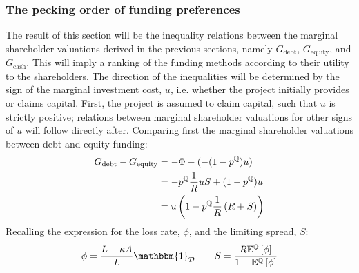 \documentclass[../main.tex]{subfiles}
\begin{document}
    \subsubsection{The pecking order of funding preferences}
        The result of this section will be the inequality relations between the marginal shareholder valuations
        derived in the previous sections, namely $G_{\text{debt}}$, $G_{\text{equity}}$, and $G_{\text{cash}}$.
        This will imply a ranking of the funding methods according to their utility to the shareholders.
        The direction of the inequalities will be determined by the sign of the marginal investment cost, $u$,
        i.e. whether the project initially provides or claims capital. 
        First, the project is assumed to claim capital, such that $u$ is strictly positive;
        relations between marginal shareholder valuations for other signs of $u$ will follow directly after.
        Comparing first the marginal shareholder valuations between debt and equity funding:
            \begin{align}
                G_{\text{debt}}
                -
                G_{\text{equity}}
                &=
                    - \Phi 
                    - 
                    (
                        - (1 - p^{\mathbb{Q}})
                        u
                    )
                    \nonumber \\
                &= 
                    - p^{\mathbb{Q}}
                    \frac{1}{R}
                    u
                    S
                    +
                    (1 - p^{\mathbb{Q}})
                    u
                    \nonumber \\
                &=
                    u \left(
                        1
                        -
                        p^{\mathbb{Q}}
                        \frac{1}{R}
                        \left(
                            R
                            +
                            S
                        \right)
                    \right)
                \label{eqn:G-debt-vs-G-equity-step-1}
            \end{align}
        Recalling the expression for the loss rate, $\phi$, and the limiting spread, $S$:
            \begin{equation*}
                \phi 
                = 
                    \frac{
                        L - \kappa A
                    }{
                        L
                    } 
                    \mathbbm{1}_{\mathcal{D}}
                \qquad
                S 
                = 
                    \frac{
                        \grossrfrate
                        \mathbb{E}^{\rnmeasure}\left[\phi\right]
                    }{
                        1
                        -
                        \mathbb{E}^{\rnmeasure}\left[\phi\right]  
                    } 
            \end{equation*}
\end{document}
